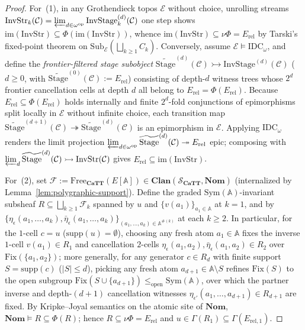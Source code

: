 \begin{proof}
For~(1), in any Grothendieck topos $\mathcal{E}$ without choice, unrolling streams $\mathrm{InvStr}_k(\mathcal{C}) = \varprojlim_{d \in \omega^{\mathrm{op}}} \mathrm{InvStage}^{(d)}_k(\mathcal{C})$ one step shows $\mathrm{im}(\mathrm{InvStr}) \subseteq \Phi(\mathrm{im}(\mathrm{InvStr}))$, whence $\mathrm{im}(\mathrm{InvStr}) \subseteq \nu\Phi = E_{\mathrm{rel}}$ by Tarski's fixed-point theorem on $\mathrm{Sub}_{\mathcal{E}}(\bigsqcup_{k \ge 1} C_k)$. Conversely, assume $\mathcal{E} \models \mathrm{IDC}_\omega$, and define the \emph{frontier-filtered stage subobject} $\widetilde{\mathrm{Stage}}^{(d)}(\mathcal{C}) \rightarrowtail \mathrm{InvStage}^{(d)}(\mathcal{C})$ ($d \ge 0$, with $\widetilde{\mathrm{Stage}}^{(0)}(\mathcal{C}) := E_{\mathrm{rel}}$) consisting of depth-$d$ witness trees whose $2^d$ frontier cancellation cells at depth $d$ all belong to $E_{\mathrm{rel}} = \Phi(E_{\mathrm{rel}})$. Because $E_{\mathrm{rel}} \subseteq \Phi(E_{\mathrm{rel}})$ holds internally and finite $2^d$-fold conjunctions of epimorphisms split locally in $\mathcal{E}$ without infinite choice, each transition map $\widetilde{\mathrm{Stage}}^{(d+1)}(\mathcal{C}) \twoheadrightarrow \widetilde{\mathrm{Stage}}^{(d)}(\mathcal{C})$ is an epimorphism in $\mathcal{E}$. Applying $\mathrm{IDC}_\omega$ renders the limit projection $\varprojlim_{d \in \omega^{\mathrm{op}}} \widetilde{\mathrm{Stage}}^{(d)}(\mathcal{C}) \twoheadrightarrow E_{\mathrm{rel}}$ epic; composing with $\varprojlim_d \widetilde{\mathrm{Stage}}^{(d)}(\mathcal{C}) \rightarrowtail \mathrm{InvStr}(\mathcal{C})$ gives $E_{\mathrm{rel}} \subseteq \mathrm{im}(\mathrm{InvStr})$.

For~(2), set $\mathcal{F} := \mathrm{Free}_{\mathbf{CaTT}}(E[\mathbb{A}]) \in \mathbf{Clan}(\mathcal{S}_{\mathbf{CaTT}}, \mathbf{Nom})$ (internalized by Lemma~\ref{lem:polygraphic-support}). Define the graded $\mathrm{Sym}(\mathbb{A})$-invariant subsheaf $R \subseteq \bigsqcup_{k \ge 1} \mathcal{F}_k$ spanned by $u$ and $\{v(a_1)\}_{a_1 \in \mathbb{A}}$ at $k = 1$, and by $\{\eta_\epsilon(a_1, \dots, a_k), \bar{\eta}_\epsilon(a_1, \dots, a_k)\}_{(a_1, \dots, a_k) \in \mathbb{A}^{\#(k)}}$ at each $k \ge 2$. In particular, for the $1$-cell $c = u$ ($\mathrm{supp}(u) = \emptyset$), choosing any fresh atom $a_1 \in \mathbb{A}$ fixes the inverse $1$-cell $v(a_1) \in R_1$ and cancellation $2$-cells $\eta_\epsilon(a_1, a_2), \bar{\eta}_\epsilon(a_1, a_2) \in R_2$ over $\mathrm{Fix}(\{a_1, a_2\})$; more generally, for any generator $c \in R_d$ with finite support $S = \mathrm{supp}(c)$ ($|S| \le d$), picking any fresh atom $a_{d+1} \in \mathbb{A} \setminus S$ refines $\mathrm{Fix}(S)$ to the open subgroup $\mathrm{Fix}(S \cup \{a_{d+1}\}) \le_{\mathrm{open}} \mathrm{Sym}(\mathbb{A})$, over which the partner inverse and depth-$(d+1)$ cancellation witnesses $\eta_{\epsilon'}(a_1, \dots, a_{d+1}) \in R_{d+1}$ are fixed. By Kripke--Joyal semantics on the atomic site of $\mathbf{Nom}$, $\mathbf{Nom} \models R \subseteq \Phi(R)$; hence $R \subseteq \nu\Phi = E_{\mathrm{rel}}$ and $u \in \Gamma(R_1) \subseteq \Gamma(E_{\mathrm{rel}, 1})$.


\end{proof}

